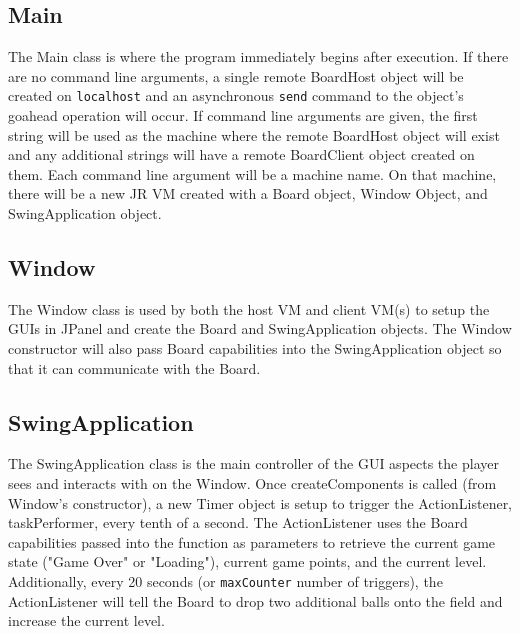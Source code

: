 \documentclass[11pt]{article}
\begin{document}
\subsection{Main}
The Main class is where the program immediately begins after execution.  If 
there are no command line arguments, a single remote BoardHost object will be
created on \texttt{localhost} and an asynchronous \texttt{send} command to the 
object's goahead operation will occur.  If command line arguments are given, 
the first string will be used as the machine where the remote BoardHost object
will exist and any additional strings will have a remote BoardClient object 
created on them.  Each command line argument will be a machine name.  On that 
machine, there will be a new JR VM created with a Board object, Window Object,
and SwingApplication object.
 
\subsection{Window}
The Window class is used by both the host VM and client VM(s) to setup the GUIs
in JPanel and create the Board and SwingApplication objects.  The Window
constructor will also pass Board capabilities into the SwingApplication object 
so that it can communicate with the Board.

\subsection{SwingApplication}
The SwingApplication class is the main controller of the GUI aspects the 
player sees and interacts with on the Window.  Once createComponents is called
(from Window's constructor), a new Timer object is setup to trigger the 
ActionListener, taskPerformer, every tenth of a second.  The ActionListener 
uses the Board capabilities passed into the function as parameters to retrieve
the current game state ("Game Over" or "Loading"), current game points, and 
the current level.  Additionally, every 20 seconds (or \texttt{maxCounter} 
number of triggers), the ActionListener will tell the Board to drop two 
additional balls onto the field and increase the current level.
\end{document}
